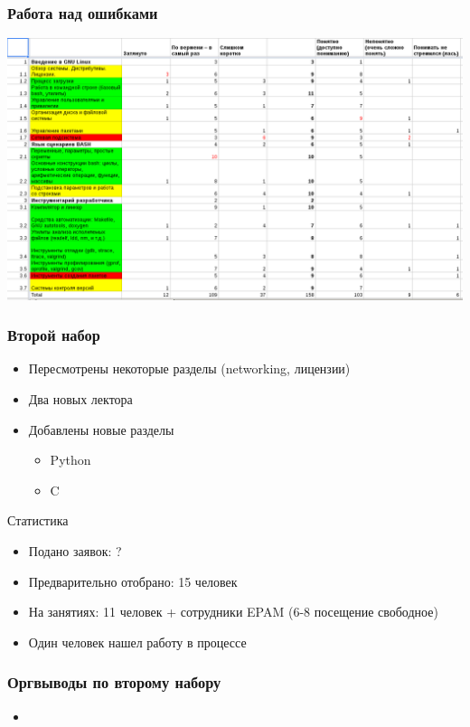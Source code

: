 \begin{frame}
  \frametitle{Работа над ошибками}
  \includegraphics[width=\textwidth]{anketa.png}
\end{frame}

\begin{frame}
\frametitle{Второй набор}
  \begin{itemize}
    \item Пересмотрены некоторые разделы (networking, лицензии)
    \item Два новых лектора
    \item Добавлены новые разделы
      \begin{itemize}
        \item Python
        \item C
      \end{itemize}
  \end{itemize}
 \begin{block}{Статистика}
    \begin{itemize}
      \item Подано заявок: ?
      \item Предварительно отобрано: 15 человек
      \item На занятиях: 11 человек + сотрудники EPAM (6-8 посещение свободное)
      \item Один человек нашел работу в процессе
    \end{itemize}
  \end{block}
\end{frame}

\begin{frame}
  \frametitle{Оргвыводы по второму набору}
  \begin{itemize}
    \item
  \end{itemize}
\end{frame}
